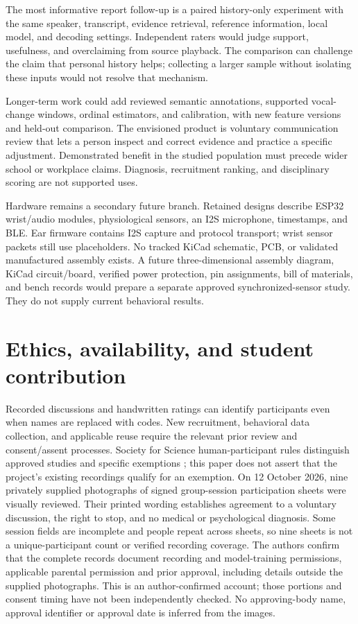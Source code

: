 \documentclass{article}
\begin{document}
The most informative report follow-up is a paired history-only experiment with the same speaker, transcript, evidence retrieval, reference information, local model, and decoding settings. Independent raters would judge support, usefulness, and overclaiming from source playback. The comparison can challenge the claim that personal history helps; collecting a larger sample without isolating these inputs would not resolve that mechanism.

Longer-term work could add reviewed semantic annotations, supported vocal-change windows, ordinal estimators, and calibration, with new feature versions and held-out comparison. The envisioned product is voluntary communication review that lets a person inspect and correct evidence and practice a specific adjustment. Demonstrated benefit in the studied population must precede wider school or workplace claims. Diagnosis, recruitment ranking, and disciplinary scoring are not supported uses.

Hardware remains a secondary future branch. Retained designs describe ESP32 wrist/audio modules, physiological sensors, an I2S microphone, timestamps, and BLE. Ear firmware contains I2S capture and protocol transport; wrist sensor packets still use placeholders. No tracked KiCad schematic, PCB, or validated manufactured assembly exists. A future three-dimensional assembly diagram, KiCad circuit/board, verified power protection, pin assignments, bill of materials, and bench records would prepare a separate approved synchronized-sensor study. They do not supply current behavioral results.

\section{Ethics, availability, and student contribution}
Recorded discussions and handwritten ratings can identify participants even when names are replaced with codes. New recruitment, behavioral data collection, and applicable reuse require the relevant prior review and consent/assent processes. Society for Science human-participant rules distinguish approved studies and specific exemptions \cite{isefhuman}; this paper does not assert that the project's existing recordings qualify for an exemption. On 12 October 2026, nine privately supplied photographs of signed group-session participation sheets were visually reviewed. Their printed wording establishes agreement to a voluntary discussion, the right to stop, and no medical or psychological diagnosis. Some session fields are incomplete and people repeat across sheets, so nine sheets is not a unique-participant count or verified recording coverage. The authors confirm that the complete records document recording and model-training permissions, applicable parental permission and prior approval, including details outside the supplied photographs. This is an author-confirmed account; those portions and consent timing have not been independently checked. No approving-body name, approval identifier or approval date is inferred from the images.
\end{document}
